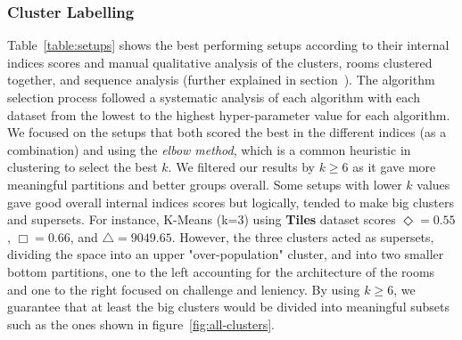 \subsubsection{Cluster Labelling}


Table~\ref{table:setups} shows the best performing setups according to their internal indices scores and manual qualitative analysis of the clusters, rooms clustered together, and sequence analysis (further explained in section~). The algorithm selection process followed a systematic analysis of each algorithm with each dataset from the lowest to the highest hyper-parameter value for each algorithm. We focused on the setups that both scored the best in the different indices (as a combination) and using the \textit{elbow method}, which is a common heuristic in clustering to select the best $k$. We filtered our results by $k\ge6$ as it  gave more meaningful partitions and better groups overall. Some setups with lower $k$ values gave good overall internal indices scores but logically, tended to make big clusters and supersets. For instance, K-Means (k=3) using \textbf{Tiles} dataset scores $\Diamond = 0.55$, $\Box = 0.66$, and $\bigtriangleup = 9049.65$. However, the three clusters acted as supersets, dividing the space into an upper "over-population" cluster, and into two smaller bottom partitions, one to the left accounting for the architecture of the rooms and one to the right focused on challenge and leniency. By using $k\ge6$, we guarantee that at least the big clusters would be divided into meaningful subsets such as the ones shown in figure~\ref{fig:all-clusters}. 



